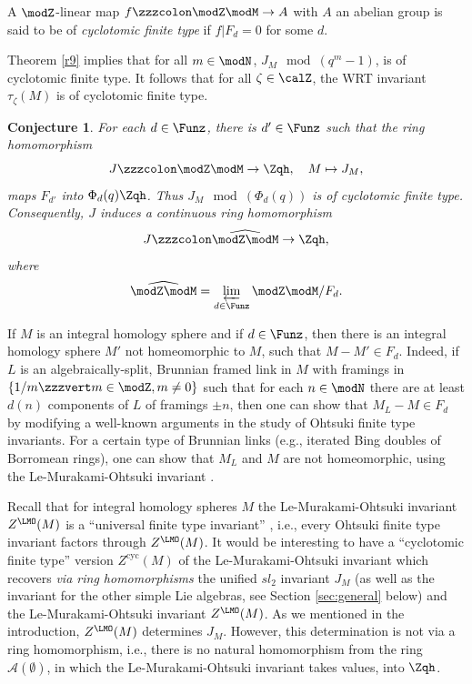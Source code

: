 \documentclass{amsart}
\numberwithin{equation}{section}
\numberwithin{figure}{section}
\theoremstyle{plain}
\newtheorem{conjecture}[theorem]{Conjecture}
\theoremstyle{definition}
\theoremstyle{remark}
\begin{document}
A $\modZ $-linear map $f\zzzcolon \modZ \modM \rightarrow A$ with $A$ an abelian group is said to be
of {\em cyclotomic finite type} if $f|F_d=0$ for some $d$.

Theorem \ref{r9} implies that for all $m\in \modN $, $J_M\mod (q^m-1)$, is
of cyclotomic finite type.  It follows that for all $\zeta \in \calZ$, the
WRT invariant $\tau _\zeta (M)$ is of cyclotomic finite type.

\begin{conjecture}
  \label{r75}
  For each $d\in \Funz$, there is $d'\in \Funz$ such that the ring
  homomorphism
  \begin{equation*}
    J\zzzcolon \modZ \modM \rightarrow \Zqh,\quad M\mapsto J_M,
  \end{equation*}
  maps $F_{d'}$ into $\Phi _d(q)\Zqh$.  Thus $J_M\mod(\Phi _d(q))$ is of
  cyclotomic finite type.  Consequently, $J$ induces a continuous ring
  homomorphism
  \begin{equation*}
    J\zzzcolon \widehat{\modZ \modM } \rightarrow  \Zqh,
  \end{equation*}
  where
  \begin{equation*}
    \widehat{\modZ \modM }= \varprojlim_{d\in \Funz}\modZ \modM /F_d.
  \end{equation*}
\end{conjecture}

If $M$ is an integral homology sphere and if $d\in \Funz$, then there is
an integral homology sphere $M'$ not homeomorphic to $M$, such that
$M-M'\in F_d$.  Indeed, if $L$ is an algebraically-split, Brunnian
framed link in $M$ with framings in $\{1/m\zzzvert m\in \modZ ,m\neq0\}$ such that
for each $n\in \modN $ there are at least $d(n)$ components of $L$ of
framings $\pm n$, then one can show that $M_L-M\in F_d$ by modifying a
well-known arguments in the study of Ohtsuki finite type invariants.
For a certain type of Brunnian links (e.g., iterated Bing doubles of
Borromean rings), one can show that $M_L$ and $M$ are not
homeomorphic, using the Le-Murakami-Ohtsuki invariant \cite{LMO}.

Recall that for integral homology spheres $M$ the Le-Murakami-Ohtsuki
invariant $Z^{\LMO}(M)$ is a ``universal finite type invariant''
\cite{Le6}, i.e., every Ohtsuki finite type invariant factors through
$Z^{\LMO}(M)$.  It would be interesting to have a ``cyclotomic finite
type'' version $Z^{\operatorname{cyc}}(M)$ of the Le-Murakami-Ohtsuki
invariant which recovers {\em via ring homomorphisms} the unified
$sl_2$ invariant $J_M$ (as well as the invariant for the other simple
Lie algebras, see Section \ref{sec:general} below) and the
Le-Murakami-Ohtsuki invariant $Z^{\LMO}(M)$.  As we mentioned in the
introduction, $Z^{\LMO}(M)$ determines $J_M$.  However, this
determination is not via a ring homomorphism, i.e., there is no
natural homomorphism from the ring $\mathcal A(\emptyset)$, in which the
Le-Murakami-Ohtsuki invariant takes values, into $\Zqh$.
\end{document}
